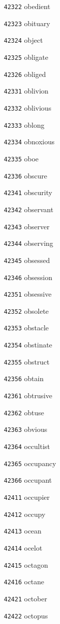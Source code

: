 \documentclass[twoside,11pt]{article}
\begin{document}
\begin{multicols}{5}
\begin{enumerate}
\item[\texttt{42322}] obedient
\item[\texttt{42323}] obituary
\item[\texttt{42324}] object
\item[\texttt{42325}] obligate
\item[\texttt{42326}] obliged
\item[\texttt{42331}] oblivion
\item[\texttt{42332}] oblivious
\item[\texttt{42333}] oblong
\item[\texttt{42334}] obnoxious
\item[\texttt{42335}] oboe
\item[\texttt{42336}] obscure
\item[\texttt{42341}] obscurity
\item[\texttt{42342}] observant
\item[\texttt{42343}] observer
\item[\texttt{42344}] observing
\item[\texttt{42345}] obsessed
\item[\texttt{42346}] obsession
\item[\texttt{42351}] obsessive
\item[\texttt{42352}] obsolete
\item[\texttt{42353}] obstacle
\item[\texttt{42354}] obstinate
\item[\texttt{42355}] obstruct
\item[\texttt{42356}] obtain
\item[\texttt{42361}] obtrusive
\item[\texttt{42362}] obtuse
\item[\texttt{42363}] obvious
\item[\texttt{42364}] occultist
\item[\texttt{42365}] occupancy
\item[\texttt{42366}] occupant
\item[\texttt{42411}] occupier
\item[\texttt{42412}] occupy
\item[\texttt{42413}] ocean
\item[\texttt{42414}] ocelot
\item[\texttt{42415}] octagon
\item[\texttt{42416}] octane
\item[\texttt{42421}] october
\item[\texttt{42422}] octopus

\end{enumerate}
\end{multicols}
\end{document}

